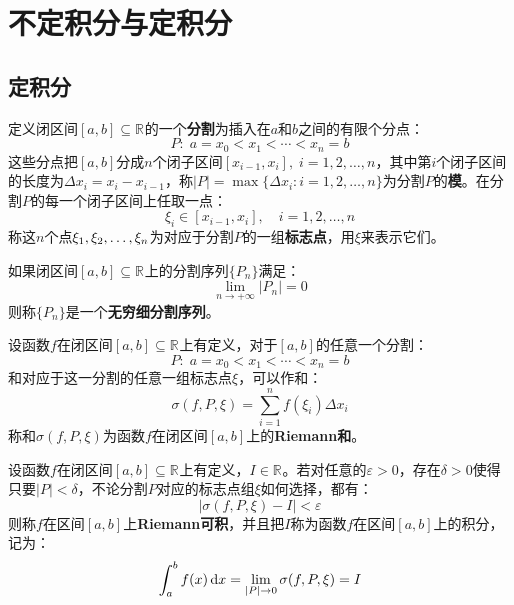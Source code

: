 \chapter{不定积分与定积分}

\section{定积分}
\begin{definition}
	定义闭区间$[a,b]\subseteq\mathbb{R}^{}$的一个\textbf{分割}为插入在$a$和$b$之间的有限个分点：
	\begin{equation*}
		P:\;a=x_0<x_1<\cdots<x_n=b
	\end{equation*}
	这些分点把$[a,b]$分成$n$个闭子区间$[x_{i-1},x_{i}],\;i=1,2,\dots,n$，其中第$i$个闭子区间的长度为$\Delta x_i=x_i-x_{i-1}$，称$|P|=\max\{\Delta x_i:i=1,2,\dots,n\}$为分割$P$的\textbf{模}。在分割$P$的每一个闭子区间上任取一点：
	\begin{equation*}
		\xi_i\in[x_{i-1},x_i],\quad i=1,2,\dots,n
	\end{equation*}
	称这$n$个点$\xi_1, \xi_2, \dots, \xi_{n}$为对应于分割$P$的一组\textbf{标志点}，用$\xi$来表示它们。
\end{definition}
\begin{definition}
	如果闭区间$[a,b]\subseteq\mathbb{R}^{}$上的分割序列$\{P_n\}$满足：
	\begin{equation*}
		\lim_{n\to+\infty}|P_n|=0
	\end{equation*}
	则称$\{P_n\}$是一个\textbf{无穷细分割序列}。
\end{definition}
\begin{definition}
	设函数$f$在闭区间$[a,b]\subseteq\mathbb{R}^{}$上有定义，对于$[a,b]$的任意一个分割：
	\begin{equation*}
		P:\;a=x_0<x_1<\cdots<x_n=b
	\end{equation*}
	和对应于这一分割的任意一组标志点$\xi$，可以作和：
	\begin{equation*}
		\sigma(f,P,\xi)=\sum_{i=1}^{n}f(\xi_i)\Delta x_i
	\end{equation*}
	称和$\sigma(f,P,\xi)$为函数$f$在闭区间$[a,b]$上的\textbf{Riemann和}。
\end{definition}
\begin{definition}
	设函数$f$在闭区间$[a,b]\subseteq\mathbb{R}^{}$上有定义，$I\in\mathbb{R}^{}$。若对任意的$\varepsilon>0$，存在$\delta>0$使得只要$|P|<\delta$，不论分割$P$对应的标志点组$\xi$如何选择，都有：
	\begin{equation*}
		|\sigma(f,P,\xi)-I|<\varepsilon
	\end{equation*}
	则称$f$在区间$[a,b]$上\textbf{Riemann可积}，并且把$I$称为函数$f$在区间$[a,b]$上的积分，记为：
	\begin{equation*}
		\int_{a}^{b}f(x)\mathop{}\!\mathrm{d} x=\lim_{|P|\to0}\sigma(f,P,\xi)=I
	\end{equation*}
\end{definition}

